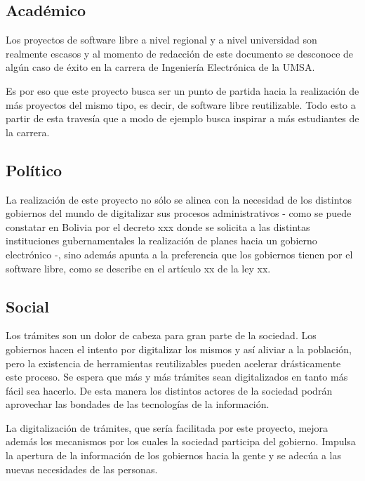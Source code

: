 \subsection{Académico}
Los proyectos de software libre a nivel regional y a nivel universidad son
realmente escasos y al momento de redacción de este documento se desconoce de
algún caso de éxito en la carrera de Ingeniería Electrónica de la UMSA. 

Es por eso que este proyecto busca ser un punto de partida hacia la realización
de más proyectos del mismo tipo, es decir, de software libre reutilizable. Todo
esto a partir de esta travesía que a modo de ejemplo busca inspirar a más
estudiantes de la carrera.

\subsection{Político}
La realización de este proyecto no sólo se alinea con la necesidad de los
distintos gobiernos del mundo de digitalizar sus procesos administrativos - como
se puede constatar en Bolivia por el decreto xxx donde se solicita a las
distintas instituciones gubernamentales la realización de planes hacia un
gobierno electrónico -, sino además apunta a la preferencia que los gobiernos
tienen por el software libre, como se describe en el artículo xx de la ley xx.

\subsection{Social}
Los trámites son un dolor de cabeza para gran parte de la sociedad. Los
gobiernos hacen el intento por digitalizar los mismos y así aliviar a la
población, pero la existencia de herramientas reutilizables pueden acelerar
drásticamente este proceso. Se espera que más y más trámites sean digitalizados
en tanto más fácil sea hacerlo. De esta manera los distintos actores de la
sociedad podrán aprovechar las bondades de las tecnologías de la información.

La digitalización de trámites, que sería facilitada por este proyecto, mejora
además los mecanismos por los cuales la sociedad participa del gobierno. Impulsa
la apertura de la información de los gobiernos hacia la gente y se adecúa a las
nuevas necesidades de las personas.